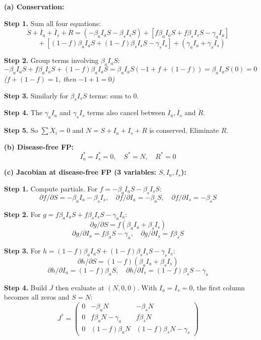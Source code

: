 \documentclass[10pt]{article}
\newcommand{\stepwhy}[1]{\textcolor{blue!60!black}{\small\textit{(#1)}}}
\begin{document}
\begin{solution}
\textbf{(a) Conservation:}

\textbf{Step 1.} Sum all four equations:
\[
\dot S + \dot{I_a} + \dot{I_s} + \dot R = (-\beta_a I_a S - \beta_s I_s S) + [f\beta_a I_a S + f\beta_s I_s S - \gamma_a I_a]
\]
\[
\quad + [(1-f)\beta_a I_a S + (1-f)\beta_s I_s S - \gamma_s I_s] + (\gamma_a I_a + \gamma_s I_s)
\]

\textbf{Step 2.} Group terms involving $\beta_a I_a S$:
\[
-\beta_a I_a S + f\beta_a I_a S + (1-f)\beta_a I_a S = \beta_a I_a S(-1 + f + (1-f)) = \beta_a I_a S(0) = 0
\]
\stepwhy{$f + (1-f) = 1$, then $-1 + 1 = 0$}

\textbf{Step 3.} Similarly for $\beta_s I_s S$ terms: sum to 0.

\textbf{Step 4.} The $\gamma_a I_a$ and $\gamma_s I_s$ terms also cancel between $\dot{I_a}, \dot{I_s}$ and $\dot R$.

\textbf{Step 5.} So $\sum \dot X_i = 0$ and $N = S + I_a + I_s + R$ is conserved. Eliminate $R$.

\medskip\textbf{(b) Disease-free FP:}
\[
I_a^* = I_s^* = 0, \quad S^* = N, \quad R^* = 0
\]

\medskip\textbf{(c) Jacobian at disease-free FP (3 variables: $S, I_a, I_s$):}

\textbf{Step 1.} Compute partials. For $f = -\beta_a I_a S - \beta_s I_s S$:
\[
\partial f/\partial S = -\beta_a I_a - \beta_s I_s, \quad \partial f/\partial I_a = -\beta_a S, \quad \partial f/\partial I_s = -\beta_s S
\]

\textbf{Step 2.} For $g = f\beta_a I_a S + f\beta_s I_s S - \gamma_a I_a$:
\[
\partial g/\partial S = f(\beta_a I_a + \beta_s I_s)
\]
\[
\partial g/\partial I_a = f\beta_a S - \gamma_a, \quad \partial g/\partial I_s = f\beta_s S
\]

\textbf{Step 3.} For $h = (1-f)\beta_a I_a S + (1-f)\beta_s I_s S - \gamma_s I_s$:
\[
\partial h/\partial S = (1-f)(\beta_a I_a + \beta_s I_s)
\]
\[
\partial h/\partial I_a = (1-f)\beta_a S, \quad \partial h/\partial I_s = (1-f)\beta_s S - \gamma_s
\]

\textbf{Step 4.} Build $J$ then evaluate at $(N, 0, 0)$. With $I_a = I_s = 0$, the first column becomes all zeros and $S = N$:
\[
J^* = \begin{pmatrix} 0 & -\beta_a N & -\beta_s N \\ 0 & f\beta_a N - \gamma_a & f\beta_s N \\ 0 & (1-f)\beta_a N & (1-f)\beta_s N - \gamma_s \end{pmatrix}
\]


\end{solution}
\end{document}
